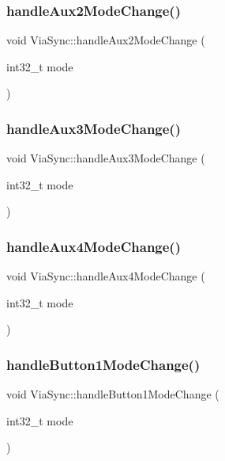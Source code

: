 \subsubsection{\texorpdfstring{handle\+Aux2\+Mode\+Change()}{handleAux2ModeChange()}}
{\footnotesize\ttfamily void Via\+Sync\+::handle\+Aux2\+Mode\+Change (\begin{DoxyParamCaption}\item[{int32\+\_\+t}]{mode }\end{DoxyParamCaption})}

\mbox{\label{class_via_sync_a61945cde541c66ac456eb57fa72968e5}} 
\subsubsection{\texorpdfstring{handle\+Aux3\+Mode\+Change()}{handleAux3ModeChange()}}
{\footnotesize\ttfamily void Via\+Sync\+::handle\+Aux3\+Mode\+Change (\begin{DoxyParamCaption}\item[{int32\+\_\+t}]{mode }\end{DoxyParamCaption})}

\mbox{\label{class_via_sync_a398169bcd5efcd7067bf45dcb871a2b5}} 
\subsubsection{\texorpdfstring{handle\+Aux4\+Mode\+Change()}{handleAux4ModeChange()}}
{\footnotesize\ttfamily void Via\+Sync\+::handle\+Aux4\+Mode\+Change (\begin{DoxyParamCaption}\item[{int32\+\_\+t}]{mode }\end{DoxyParamCaption})}

\mbox{\label{class_via_sync_ade251d6864dbf40a30d530113a8db7c4}} 
\subsubsection{\texorpdfstring{handle\+Button1\+Mode\+Change()}{handleButton1ModeChange()}}
{\footnotesize\ttfamily void Via\+Sync\+::handle\+Button1\+Mode\+Change (\begin{DoxyParamCaption}\item[{int32\+\_\+t}]{mode }\end{DoxyParamCaption})}

